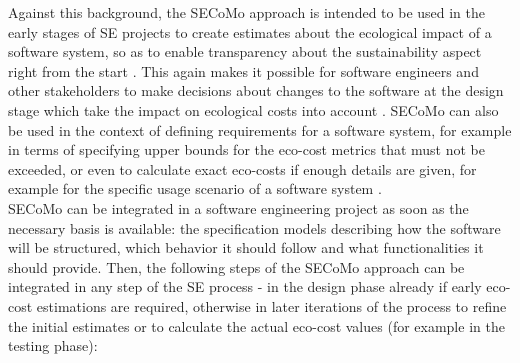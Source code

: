 \documentclass[oribibl]{llncs}
\begin{document}
Against this background, the SECoMo approach is intended to be used in the early stages of SE projects to create estimates about the ecological impact of a software system, so as to enable transparency about the sustainability aspect right from the start \cite{schulze_cost_2016}. This again makes it possible for software engineers and other stakeholders to make decisions about changes to the software at the design stage which take the impact on ecological costs into account \cite{schulze_cost_2016}. 
SECoMo can also be used in the context of defining requirements for a software system, for example in terms of specifying upper bounds for the eco-cost metrics that must not be exceeded, or even to calculate exact eco-costs if enough details are given, for example for the specific usage scenario of a software system %
\cite{schulze_cost_2016}.\\
SECoMo can be integrated in a software engineering project as soon as the necessary basis is available: the specification models describing how the software will be structured, which behavior it should follow and what functionalities it should provide. %
Then, the following steps of the SECoMo approach can be integrated in any step of the SE process - in the design phase already if early eco-cost estimations are required, otherwise in later iterations of the process to refine the initial estimates or to calculate the actual eco-cost values (for example in the testing phase):\\
\end{document}
